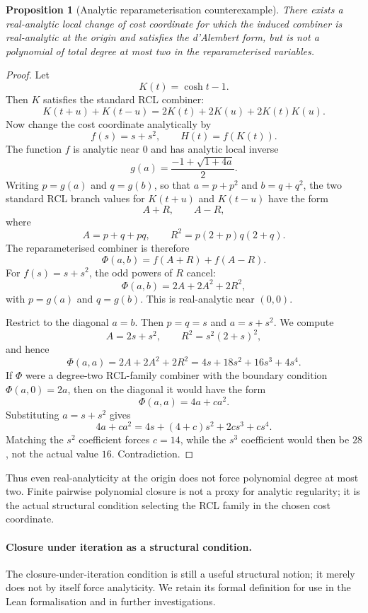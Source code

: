 \documentclass[11pt,a4paper]{article}
\newtheorem{proposition}[theorem]{Proposition}
\theoremstyle{definition}
\theoremstyle{remark}
\begin{document}
\begin{proposition}[Analytic reparameterisation counterexample]
\label{prop:analytic-reparam-counterexample}
There exists a real-analytic local change of cost coordinate for which
the induced combiner is real-analytic at the origin and satisfies the
d'Alembert form, but is not a polynomial of total degree at most two in
the reparameterised variables.
\end{proposition}

\begin{proof}
Let
\[
K(t)=\cosh t - 1.
\]
Then $K$ satisfies the standard RCL combiner:
\[
K(t+u)+K(t-u)=2K(t)+2K(u)+2K(t)K(u).
\]
Now change the cost coordinate analytically by
\[
f(s)=s+s^2,\qquad H(t)=f(K(t)).
\]
The function $f$ is analytic near $0$ and has analytic local inverse
\[
g(a)=\frac{-1+\sqrt{1+4a}}{2}.
\]
Writing $p=g(a)$ and $q=g(b)$, so that $a=p+p^2$ and $b=q+q^2$, the two
standard RCL branch values for $K(t+u)$ and $K(t-u)$ have the form
\[
A+R,\qquad A-R,
\]
where
\[
A=p+q+pq,\qquad R^2=p(2+p)q(2+q).
\]
The reparameterised combiner is therefore
\[
\Phi(a,b)=f(A+R)+f(A-R).
\]
For $f(s)=s+s^2$, the odd powers of $R$ cancel:
\[
\Phi(a,b)=2A+2A^2+2R^2,
\]
with $p=g(a)$ and $q=g(b)$. This is real-analytic near $(0,0)$.

Restrict to the diagonal $a=b$. Then $p=q=s$ and $a=s+s^2$. We compute
\[
A=2s+s^2,\qquad R^2=s^2(2+s)^2,
\]
and hence
\[
\Phi(a,a)=2A+2A^2+2R^2
         =4s+18s^2+16s^3+4s^4.
\]
If $\Phi$ were a degree-two RCL-family combiner with the boundary
condition $\Phi(a,0)=2a$, then on the diagonal it would have the form
\[
\Phi(a,a)=4a+c a^2.
\]
Substituting $a=s+s^2$ gives
\[
4a+c a^2
=4s+(4+c)s^2+2c s^3+c s^4.
\]
Matching the $s^2$ coefficient forces $c=14$, while the $s^3$ coefficient
would then be $28$, not the actual value $16$. Contradiction.
\end{proof}

Thus even real-analyticity at the origin does not force polynomial degree
at most two. Finite pairwise polynomial closure is not a proxy for
analytic regularity; it is the actual structural condition selecting the
RCL family in the chosen cost coordinate.

\paragraph{Closure under iteration as a structural condition.} The
closure-under-iteration condition is still a useful structural notion;
it merely does not by itself force analyticity. We retain its
formal definition for use in the Lean formalisation and in further
investigations.
\end{document}
